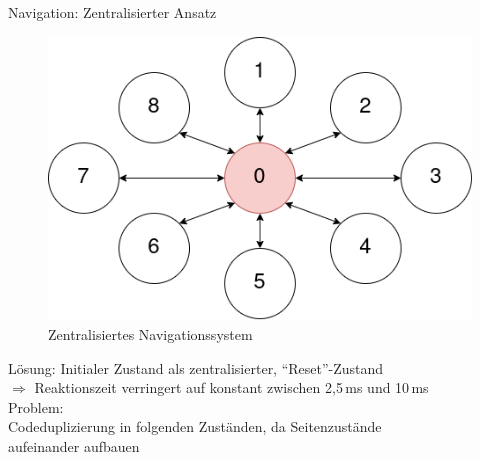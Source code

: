 \documentclass{beamer}
\begin{document}
\begin{frame}{Navigation: Zentralisierter Ansatz}
\begin{figure}
\center
\begin{minipage}{.5\textwidth}
\includegraphics[width=\textwidth]{figures/navigationsystem-central-overview.png}
\end{minipage}
\caption{Zentralisiertes Navigationssystem}
\end{figure}
Lösung: Initialer Zustand als zentralisierter, ``Reset''-Zustand\\
$\Rightarrow$ Reaktionszeit verringert auf konstant zwischen 2,5\,ms und 10\,ms \vspace{0.5em}\\
Problem: \\
\hspace{1em}Codeduplizierung in folgenden Zuständen, da Seitenzustände\\
\hspace{1em}aufeinander aufbauen
\end{frame}
\end{document}
